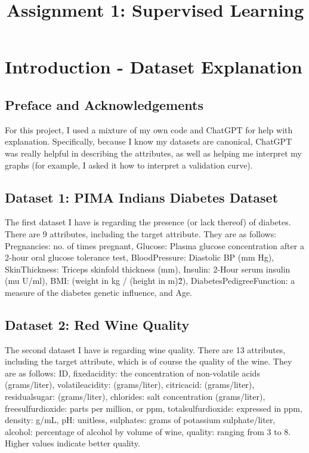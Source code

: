 \documentclass[conference]{IEEEtran}
\begin{document}
\title{Assignment 1: Supervised Learning\\
}

\author{
}

\maketitle

\section{Introduction - Dataset Explanation}

\subsection{Preface and Acknowledgements}
For this project, I used a mixture of my own code and ChatGPT for help with explanation. Specifically, because I know my datasets are canonical, ChatGPT was really helpful in describing the attributes, as well as helping me interpret my graphs (for example, I asked it how to interpret a validation curve). 

\subsection{Dataset 1: PIMA Indians Diabetes Dataset}
The first dataset I have is regarding the presence (or lack thereof) of diabetes. There are 9 attributes, including the target attribute. They are as follows: Pregnancies: no. of times pregnant, Glucose: Plasma glucose concentration after a 2-hour oral glucose tolerance test, BloodPressure: Diastolic BP (mm Hg), SkinThickness: Triceps skinfold thickness (mm), Insulin: 2-Hour serum insulin (mu U/ml), BMI: (weight in kg / (height in m)\^2), DiabetesPedigreeFunction: a measure of the diabetes genetic influence, and Age. 

\subsection{Dataset 2: Red Wine Quality}
The second dataset I have is regarding wine quality. There are 13 attributes, including the target attribute, which is of course the quality of the wine. They are as follows: ID, fixedacidity: the concentration of non-volatile acids (grams/liter), volatileacidity: (grams/liter), citricacid: (grams/liter), residualsugar: (grams/liter), chlorides: salt concentration (grams/liter), freesulfurdioxide: parts per million, or ppm, totalsulfurdioxide: expressed in ppm, density: g/mL, pH: unitless, sulphates: grams of potassium sulphate/liter, alcohol: percentage of alcohol by volume of wine, quality: ranging from 3 to 8. Higher values indicate better quality. 
\end{document}
